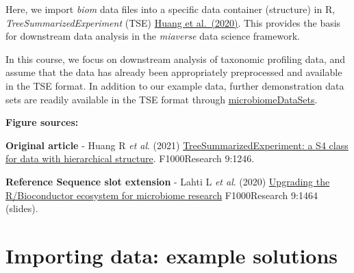 \documentclass[
  oneside]{book}
\begin{document}
Here, we import \emph{biom} data files into a specific data container (structure)
in R, \emph{TreeSummarizedExperiment} (TSE) \href{https://f1000research.com/articles/9-1246}{Huang et
al.~(2020)}. This provides
the basis for downstream data analysis in the \emph{miaverse} data science
framework.

In this course, we focus on downstream analysis of taxonomic profiling
data, and assume that the data has already been appropriately
preprocessed and available in the TSE format. In addition to our
example data, further demonstration data sets are readily available in
the TSE format through
\href{https://bioconductor.org/packages/release/data/experiment/html/microbiomeDataSets.html}{microbiomeDataSets}.

\textbf{Figure sources:}

\textbf{Original article}
- Huang R \emph{et al}. (2021) \href{https://doi.org/10.12688/\%20f1000research.26669.2}{TreeSummarizedExperiment: a S4 class
for data with hierarchical structure}. F1000Research 9:1246.

\textbf{Reference Sequence slot extension}
- Lahti L \emph{et al}. (2020) \href{https://doi.org/10.7490/\%20f1000research.1118447.1}{Upgrading the R/Bioconductor ecosystem for microbiome
research} F1000Research 9:1464 (slides).

\hypertarget{importing-data-example-solutions}{%
\section{Importing data: example solutions}\label{importing-data-example-solutions}}
\end{document}
